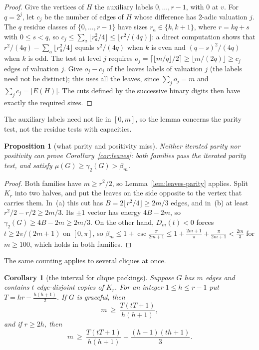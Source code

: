 \documentclass[11pt]{amsart}
\newcommand{\thmmarker}{}
\newcommand{\mgpt}{\gdef\thmmarker{\textsuperscript{$\dagger$}}}
\theoremstyle{tplain}
\newtheorem{corollary}[theorem]{Corollary}
\newtheorem{proposition}[theorem]{Proposition}
\theoremstyle{tdefinition}
\theoremstyle{tremark}
\begin{document}
\begin{proof}
Give the vertices of $H$ the auxiliary labels $0,\dots,r-1$, with $0$ at $v$.
For $q=2^j$, let $c_j$ be the number of edges of $H$ whose difference has
$2$-adic valuation $j$. The $q$ residue classes of $\{0,\dots,r-1\}$ have
sizes $r_a\in\{k,k+1\}$, where $r=kq+s$ with $0\le s<q$, so
$c_j\le\sum_a\lfloor r_a^2/4\rfloor\le\lfloor r^2/(4q)\rfloor$: a direct
computation shows that $r^2/(4q)-\sum_a\lfloor r_a^2/4\rfloor$ equals
$s^2/(4q)$ when $k$ is even and $(q-s)^2/(4q)$ when $k$ is odd. The test at
level $j$ requires $o_j=\lceil\lfloor m/q\rfloor/2\rceil\ge\lfloor
m/(2q)\rfloor\ge c_j$ edges of valuation $j$. Give $o_j-c_j$ of the leaves labels of valuation $j$ (the labels need not
be distinct); this uses all the leaves, since $\sum_jo_j=m$ and
$\sum_jc_j=|E(H)|$. The cuts defined by the successive binary digits then
have exactly the required sizes.
\end{proof}

The auxiliary labels need not lie in $[0,m]$, so the lemma concerns the
parity test, not the residue tests with capacities.

\mgpt\begin{proposition}[what parity and positivity miss]\label{prop:missed}
Neither iterated parity nor positivity can prove Corollary~\ref{cor:leaves}: both
families pass the iterated parity test, and
satisfy $\mu(G)\ge\gamma_2(G)>\beta_m$.
\end{proposition}

\begin{proof}
Both families have $m\ge r^2/2$, so Lemma~\ref{lem:leaves-parity} applies.
Split $K_r$ into two halves, and put the leaves on the side opposite to
the vertex that carries them. In~(a)
this cut has $B=2\lfloor r^2/4\rfloor\ge2m/3$ edges, and in~(b) at least
$r^2/2-r/2\ge2m/3$. Its $\pm1$ vector has energy $4B-2m$, so
$\gamma_2(G)\ge4B-2m\ge2m/3$. On the other hand, $D_m(t)<0$ forces
$t\ge2\pi/(2m+1)$ on $[0,\pi]$, so $\beta_m\le1+\csc\frac\pi{2m+1}
\le1+\frac{2m+1}\pi+\frac\pi{2m+1}<\frac{2m}3$ for $m\ge100$, which holds in both families.
\end{proof}

The same counting applies to several cliques at once.

\mgpt\begin{corollary}[the interval for clique packings]\label{cor:packing}
Suppose $G$ has $m$ edges and contains $t$ edge-disjoint copies of $K_r$. For
an integer $1\le h\le r-1$ put $T=hr-\frac{h(h+1)}2$. If $G$ is graceful, then
\[
  m\ \ge\ \frac{T(tT+1)}{h(h+1)},
\]
and if $r\ge2h$, then
\[
  m\ \ge\ \frac{T(tT+1)}{h(h+1)}+\frac{(h-1)(th+1)}3 .
\]
\end{corollary}
\end{document}
